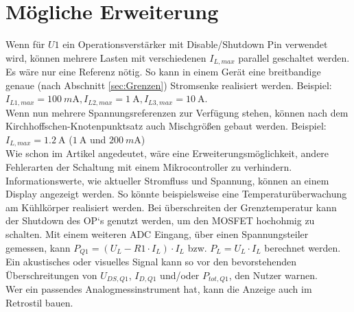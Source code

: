 \section{Mögliche Erweiterung}

Wenn für $U1$ ein Operationsverstärker mit Disable/Shutdown Pin verwendet wird, können mehrere Lasten mit 
verschiedenen $I_{L,max}$ parallel geschaltet werden. 
Es wäre nur eine Referenz nötig. 
So kann in einem Gerät eine breitbandige genaue 
(nach Abschnitt \ref{sec:Grenzen}) Stromsenke realisiert werden. 
Beispiel: $I_{L1,max} = \SI{100}{m\ampere}, I_{L2,max} = \SI{1}{\ampere}, I_{L3,max} = \SI{10}{\ampere}$.\\

Wenn nun mehrere Spannungsreferenzen zur Verfügung stehen, können nach dem Kirchhoffschen-Knotenpunktsatz auch \grqq Mischgrößen\grqq{} 
gebaut werden.
Beispiel: $I_{L,max} = \SI{1,2}{\ampere}$ ($\SI{1}{\ampere}$ und $\SI{200}{m\ampere}$)\\


Wie schon im Artikel angedeutet, wäre eine Erweiterungsmöglichkeit, andere Fehlerarten der Schaltung 
mit einem Mikrocontroller zu verhindern.
Informationswerte, wie aktueller Stromfluss und Spannung, können an einem Display angezeigt werden.
So könnte beispielsweise eine Temperaturüberwachung am Kühlkörper realisiert werden.
Bei überschreiten der Grenztemperatur kann der Shutdown des OP`s genutzt werden, um den MOSFET hochohmig zu schalten.
Mit einem weiteren ADC Eingang, über einen Spannungsteiler gemessen, kann $P_{Q1} = (U_{L} - R1 \cdot I_{L}) \cdot I_{L}$ bzw. 
$P_{L} = U_{L} \cdot I_{L}$ berechnet werden. 
Ein akustisches oder visuelles Signal kann so vor den bevorstehenden Überschreitungen von 
$U_{DS,Q1}$, $I_{D,Q1}$ und/oder $P_{tot,Q1}$, den Nutzer warnen.\\

Wer ein passendes Analogmessinstrument hat, kann die Anzeige auch im Retrostil bauen.